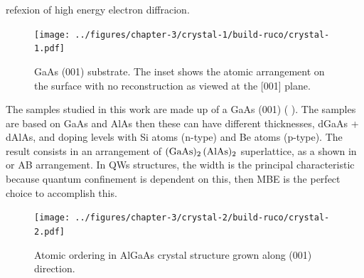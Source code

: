 refexion of high energy electron diffracion\cite{orton2015molecular,grundmann2010physics}.
\begin{figure}[H]
	\centering
	\texttt{[image: ../figures/chapter-3/crystal-1/build-ruco/crystal-1.pdf]}
	\caption[GaAs substrate growth direction]{GaAs (001) substrate. The inset shows the atomic arrangement on the surface with no reconstruction as viewed at the [001] plane.
	}
	\label{fig:chapter-3 GaAs Substrate}
\end{figure}

The samples studied in this work are made up of a GaAs (001) ( ).  The samples are based on  GaAs and AlAs then these can have different thicknesses, dGaAs + dAlAs, and doping levels with Si atoms (n-type) and Be atoms (p-type).
The result consists in an arrangement of $(\displaystyle\text{\normalfont GaAs})_{2}\,(\displaystyle\text{\normalfont AlAs})_{2}$ superlattice,  as a  shown in   or AB arrangement. In QWs structures, the width is the principal characteristic because quantum confinement is dependent on this, then MBE is the perfect choice to accomplish this.  
\begin{figure}[hbtp!]
	\centering
	\texttt{[image: ../figures/chapter-3/crystal-2/build-ruco/crystal-2.pdf]}
	\caption[AlGaAs superlattice]{Atomic ordering in AlGaAs crystal structure grown  along (001) direction. }
	\label{fig:chapter-3 AlGaAs Cell}
\end{figure}

